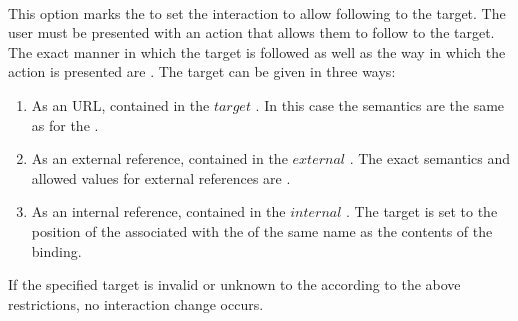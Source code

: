  \\

This option marks the  to set the interaction to allow following to the target. The user must be presented with an action that allows them to follow to the target. The exact manner in which the target is followed as well as the way in which the action is presented are . The target can be given in three ways:
\begin{enumerate}
\item As an URL, contained in the \inline$target$ . In this case the semantics are the same as for the  .
\item As an external reference, contained in the \inline$external$ . The exact semantics and allowed values for external references are .
\item As an internal reference, contained in the \inline$internal$ . The target is set to the position of the  associated with the  of the same name as the contents of the binding.
\end{enumerate}
If the specified target is invalid or unknown to the  according to the above restrictions, no interaction change occurs. \\

\begin{examples}
\end{examples}


